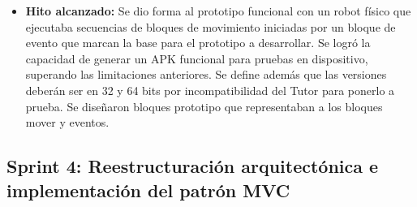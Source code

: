 \begin{itemize}
\begin{itemize}
\end{itemize}
	\item \textbf{Hito alcanzado:} Se dio forma al prototipo funcional con un robot físico que ejecutaba secuencias de bloques de movimiento iniciadas por un bloque de evento que marcan la base para el prototipo a desarrollar. Se logró la capacidad de generar un APK funcional para pruebas en dispositivo, superando las limitaciones anteriores. Se define además que las versiones deberán ser en 32 y 64 bits por incompatibilidad del Tutor para ponerlo a prueba. Se diseñaron bloques prototipo que representaban a los bloques mover y eventos.
\end{itemize}


\subsection{Sprint 4: Reestructuración arquitectónica e implementación del patrón MVC} 

